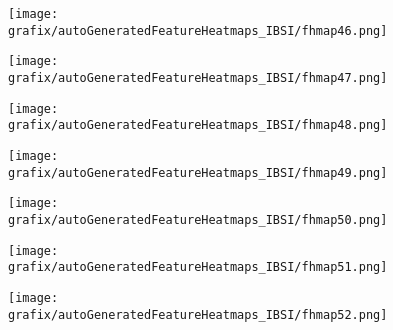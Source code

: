 \hspace{\hsp} 
\begin{subfigure}{\wid\textwidth} 
    \centering 
    \caption{\tiny \sffamily {}} 
    \vspace{\vsp} 
    \texttt{[image: grafix/autoGeneratedFeatureHeatmaps\_IBSI/fhmap46.png]} 
\end{subfigure} 
\hspace{\hsp} 
\begin{subfigure}{\wid\textwidth} 
    \centering 
    \caption{\tiny \sffamily {}} 
    \vspace{\vsp} 
    \texttt{[image: grafix/autoGeneratedFeatureHeatmaps\_IBSI/fhmap47.png]} 
\end{subfigure} 
\hspace{\hsp} 
\begin{subfigure}{\wid\textwidth} 
    \centering 
    \caption{\tiny \sffamily {}} 
    \vspace{\vsp} 
    \texttt{[image: grafix/autoGeneratedFeatureHeatmaps\_IBSI/fhmap48.png]} 
\end{subfigure} 
\hspace{\hsp} 
\begin{subfigure}{\wid\textwidth} 
    \centering 
    \caption{\tiny \sffamily {}} 
    \vspace{\vsp} 
    \texttt{[image: grafix/autoGeneratedFeatureHeatmaps\_IBSI/fhmap49.png]} 
\end{subfigure} 
\hspace{\hsp} 
\begin{subfigure}{\wid\textwidth} 
    \centering 
    \caption{\tiny \sffamily {}} 
    \vspace{\vsp} 
    \texttt{[image: grafix/autoGeneratedFeatureHeatmaps\_IBSI/fhmap50.png]} 
\end{subfigure} 
\hspace{\hsp} 
\begin{subfigure}{\wid\textwidth} 
    \centering 
    \caption{\tiny \sffamily {}} 
    \vspace{\vsp} 
    \texttt{[image: grafix/autoGeneratedFeatureHeatmaps\_IBSI/fhmap51.png]} 
\end{subfigure} 
\hspace{\hsp} 
\begin{subfigure}{\wid\textwidth} 
    \centering 
    \caption{\tiny \sffamily {}} 
    \vspace{\vsp} 
    \texttt{[image: grafix/autoGeneratedFeatureHeatmaps\_IBSI/fhmap52.png]} 
\end{subfigure} 
